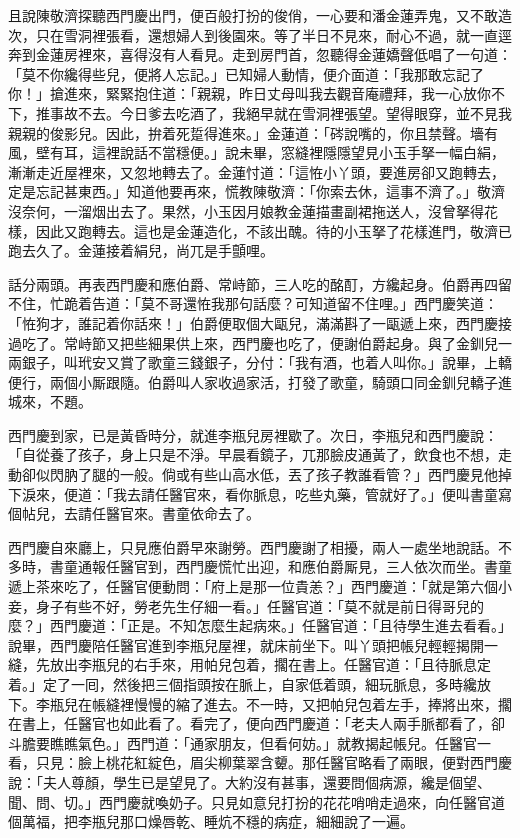 且說陳敬濟探聽西門慶出門，便百般打扮的俊俏，一心要和潘金蓮弄鬼，又不敢造次，只在雪洞裡張看，還想婦人到後園來。等了半日不見來，耐心不過，就一直逕奔到金蓮房裡來，喜得沒有人看見。走到房門首，忽聽得金蓮嬌聲低唱了一句道：「莫不你纔得些兒，便將人忘記。」{}已知婦人動情，便介面道：「我那敢忘記了你！」搶進來，緊緊抱住道：「親親，昨日丈母叫我去觀音庵禮拜，我一心放你不下，推事故不去。今日爹去吃酒了，我絕早就在雪洞裡張望。望得眼穿，並不見我親親的俊影兒。{}因此，拚着死踅得進來。」金蓮道：「硶說嘴的，你且禁聲。墻有風，壁有耳，這裡說話不當穩便。」說未畢，窓縫裡隱隱望見小玉手拏一幅白絹，漸漸走近屋裡來，又忽地轉去了。金蓮忖道：「這恠小丫頭，要進房卻又跑轉去，定是忘記甚東西。」知道他要再來，慌教陳敬濟：「你索去休，這事不濟了。」敬濟沒奈何，一溜烟出去了。{}果然，小玉因月娘教金蓮描畫副裙拖送人，沒曾拏得花樣，因此又跑轉去。這也是金蓮造化，不該出醜。待的小玉拏了花樣進門，敬濟已跑去久了。金蓮接着絹兒，尚兀是手顫哩。

話分兩頭。再表西門慶和應伯爵、常峙節，三人吃的酩酊，方纔起身。伯爵再四留不住，忙跪着告道：「莫不哥還恠我那句話麼？可知道留不住哩。」西門慶笑道：「恠狗才，誰記着你話來！」伯爵便取個大甌兒，滿滿斟了一甌遞上來，西門慶接過吃了。常峙節又把些細果供上來，西門慶也吃了，便謝伯爵起身。與了金釧兒一兩銀子，叫玳安又賞了歌童三錢銀子，分付：「我有酒，也着人叫你。」說畢，上轎便行，兩個小厮跟隨。伯爵叫人家收過家活，打發了歌童，騎頭口同金釧兒轎子進城來，不題。

西門慶到家，已是黃昏時分，就進李瓶兒房裡歇了。次日，李瓶兒和西門慶說：「自從養了孩子，身上只是不淨。早晨看鏡子，兀那臉皮通黃了，飲食也不想，走動卻似閃肭了腿的一般。倘或有些山高水低，丟了孩子教誰看管？」西門慶見他掉下淚來，便道：「我去請任醫官來，看你脈息，吃些丸藥，管就好了。」便叫書童寫個帖兒，去請任醫官來。書童依命去了。

西門慶自來廳上，只見應伯爵早來謝勞。西門慶謝了相擾，兩人一處坐地說話。不多時，書童通報任醫官到，西門慶慌忙出迎，和應伯爵厮見，三人依次而坐。書童遞上茶來吃了，任醫官便動問：「府上是那一位貴恙？」西門慶道：「就是第六個小妾，身子有些不好，勞老先生仔細一看。」任醫官道：「莫不就是前日得哥兒的麼？」西門慶道：「正是。不知怎麼生起病來。」任醫官道：「且待學生進去看看。」說畢，西門慶陪任醫官進到李瓶兒屋裡，就床前坐下。叫丫頭把帳兒輕輕揭開一縫，先放出李瓶兒的右手來，用帕兒包着，擱在書上。任醫官道：「且待脈息定着。」定了一囘，然後把三個指頭按在脈上，{}自家低着頭，細玩脈息，{}多時纔放下。李瓶兒在帳縫裡慢慢的縮了進去。不一時，又把帕兒包着左手，捧將出來，擱在書上，任醫官也如此看了。看完了，便向西門慶道：「老夫人兩手脈都看了，卻斗膽要瞧瞧氣色。」西門道：「通家朋友，但看何妨。」就教揭起帳兒。{}任醫官一看，只見：臉上桃花紅綻色，眉尖柳葉翠含顰。那任醫官略看了兩眼，便對西門慶說：「夫人尊顏，學生已是望見了。大約沒有甚事，還要問個病源，纔是個望、聞、問、切。」西門慶就喚奶子。只見如意兒打扮的花花哨哨走過來，向任醫官道個萬福，把李瓶兒那口燥唇乾、睡炕不穩的病症，細細說了一遍。

